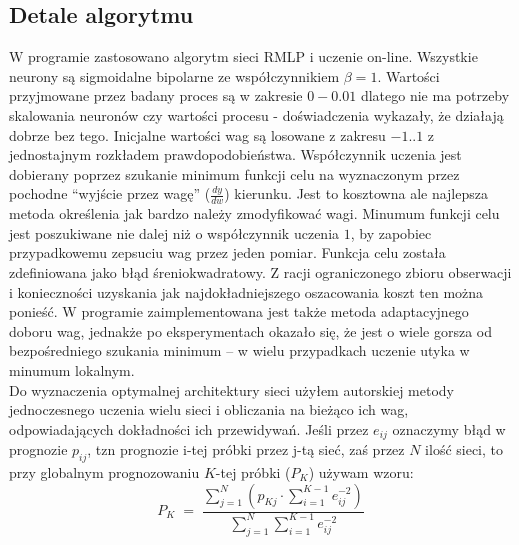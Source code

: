 \documentclass[12pt,a4]{article}
\begin{document}
\subsection{Detale algorytmu}
W programie zastosowano algorytm sieci RMLP i uczenie on-line.
Wszystkie neurony są sigmoidalne bipolarne ze współczynnikiem $\beta=1$.
Wartości przyjmowane przez badany proces są w zakresie $0-0.01$ dlatego nie ma potrzeby skalowania neuronów czy 
wartości procesu - doświadczenia wykazały, że działają dobrze bez tego.
Inicjalne wartości wag są losowane z zakresu $-1..1$ z jednostajnym rozkładem prawdopodobieństwa.
Współczynnik uczenia jest dobierany poprzez szukanie minimum funkcji celu
na wyznaczonym przez pochodne ``wyjście przez wagę'' ($\frac{dy}{dw}$) kierunku. 
Jest to kosztowna ale najlepsza metoda określenia jak bardzo należy zmodyfikować wagi. 
Minumum funkcji celu jest poszukiwane nie dalej niż o współczynnik uczenia $1$, by zapobiec przypadkowemu zepsuciu wag
przez jeden pomiar. Funkcja celu została zdefiniowana jako błąd śreniokwadratowy.
Z racji ograniczonego zbioru obserwacji i konieczności uzyskania jak 
najdokładniejszego oszacowania koszt ten można ponieść. W programie zaimplementowana jest także metoda adaptacyjnego 
doboru wag, jednakże po eksperymentach okazało się, że jest o wiele gorsza od bezpośredniego szukania minimum -- w wielu
przypadkach uczenie utyka w minumum lokalnym.\\
\indent Do wyznaczenia optymalnej architektury sieci użyłem autorskiej metody jednoczesnego uczenia wielu sieci i 
obliczania na bieżąco ich wag, odpowiadających dokładności ich przewidywań. Jeśli przez $e_{ij}$ oznaczymy błąd w 
prognozie $p_{ij}$, tzn prognozie i-tej próbki przez j-tą sieć, zaś przez $N$ ilość sieci, 
to przy globalnym prognozowaniu $K$-tej próbki ($P_{K}$) używam wzoru:
\begin{displaymath}
P_K\;=\;\frac{\sum_{j=1}^N\left(p_{Kj}\cdot\sum_{i=1}^{K-1}e_{ij}^{-2}\right)}{\sum_{j=1}^N\sum_{i=1}^{K-1}e_{ij}^{-2}}
\end{displaymath}
\end{document}
